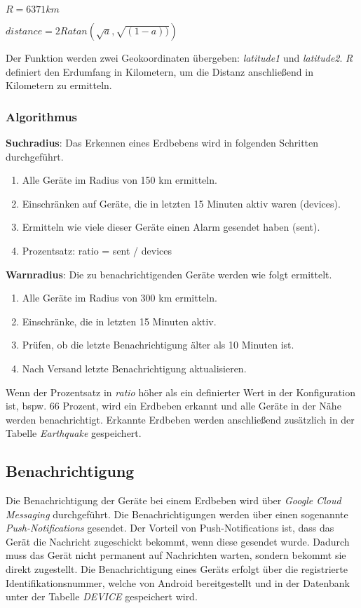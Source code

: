 \begin{math}R = 6371 km\end{math}

\begin{math}distance = 2R atan(\sqrt{a}, \sqrt{(1-a))})\end{math}


Der Funktion werden zwei Geokoordinaten übergeben: \textit{latitude1} und \textit{latitude2}. \textit{R} definiert den Erdumfang in Kilometern, um die Distanz anschließend in Kilometern zu ermitteln.

\subsubsection{Algorithmus}
\textbf{Suchradius}: Das Erkennen eines Erdbebens wird in folgenden Schritten durchgeführt.

\begin{enumerate} 
\item Alle Geräte im Radius von 150 km ermitteln.
\item Einschränken auf Geräte, die in letzten 15 Minuten aktiv waren (devices). 
\item Ermitteln wie viele dieser Geräte einen Alarm gesendet haben (sent).
\item Prozentsatz: ratio = sent / devices
\end{enumerate}

\textbf{Warnradius}: Die zu benachrichtigenden Geräte werden wie folgt ermittelt.

\begin{enumerate} 
\item Alle Geräte im Radius von 300 km ermitteln.
\item Einschränke, die in letzten 15 Minuten aktiv.
\item Prüfen, ob die letzte Benachrichtigung älter als 10 Minuten ist.
\item Nach Versand letzte Benachrichtigung aktualisieren.
\end{enumerate}

Wenn der Prozentsatz in \textit{ratio} höher als ein definierter Wert in der Konfiguration ist, bspw. 66 Prozent, wird ein Erdbeben erkannt und alle Geräte in der Nähe werden benachrichtigt. Erkannte Erdbeben werden anschließend zusätzlich in der Tabelle \textit{Earthquake} gespeichert.

\subsection{Benachrichtigung}
Die Benachrichtigung der Geräte bei einem Erdbeben wird über \textit{Google Cloud Messaging}  durchgeführt. Die Benachrichtigungen werden über einen sogenannte \textit{Push-Notifications} gesendet. Der Vorteil von Push-Notifications ist, dass das Gerät die Nachricht zugeschickt bekommt, wenn diese gesendet wurde. Dadurch muss das Gerät nicht permanent auf Nachrichten warten, sondern bekommt sie direkt zugestellt. Die Benachrichtigung eines Geräts erfolgt über die registrierte Identifikationsnummer, welche von Android bereitgestellt und in der Datenbank unter der Tabelle \textit{DEVICE} gespeichert wird. 

